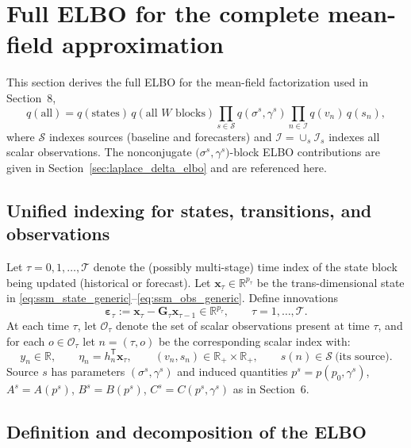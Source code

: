 \documentclass[11pt]{article}
\newcommand{\R}{\mathbb{R}}
\newcommand{\1}{\mathbb{I}}
\newcommand{\T}{\mathsf{T}}
\begin{document}
\section{Full ELBO for the complete mean-field approximation}
\label{sec:full_elbo}

This section derives the full ELBO for the mean-field factorization used in Section~8,
\[
q(\text{all}) = q(\text{states})\,q(\text{all }W\text{ blocks})
\prod_{s\in\mathcal{S}} q(\sigma^s,\gamma^s)\prod_{n\in\mathcal{I}} q(v_n)\,q(s_n),
\]
where $\mathcal{S}$ indexes sources (baseline and forecasters) and $\mathcal{I}=\cup_s \mathcal{I}_s$
indexes all scalar observations. The nonconjugate $\big(\sigma^s,\gamma^s\big)$-block ELBO contributions
are given in Section~\ref{sec:laplace_delta_elbo} and are referenced here.

\subsection{Unified indexing for states, transitions, and observations}

Let $\tau=0,1,\dots,\mathcal{T}$ denote the (possibly multi-stage) time index of the state block being updated
(historical or forecast). Let $\bm x_\tau\in\R^{p_\tau}$ be the trans-dimensional state in
\eqref{eq:ssm_state_generic}--\eqref{eq:ssm_obs_generic}. Define innovations
\[
\bm\varepsilon_\tau := \bm x_\tau - \bm G_\tau \bm x_{\tau-1}\in\R^{p_\tau},
\qquad \tau=1,\dots,\mathcal{T}.
\]
At each time $\tau$, let $\mathcal{O}_\tau$ denote the set of scalar observations present at time $\tau$,
and for each $o\in\mathcal{O}_\tau$ let $n=(\tau,o)$ be the corresponding scalar index with:
\[
y_n\in\R,\qquad \eta_n = h_n^\T \bm x_\tau,\qquad (v_n,s_n)\in\R_+\times\R_+,
\qquad s(n)\in\mathcal{S}\ \text{(its source)}.
\]
Source $s$ has parameters $(\sigma^s,\gamma^s)$ and induced quantities
$p^s=p(p_0,\gamma^s)$, $A^s=A(p^s)$, $B^s=B(p^s)$, $C^s=C(p^s,\gamma^s)$ as in Section~6.

\subsection{Definition and decomposition of the ELBO}
\end{document}
